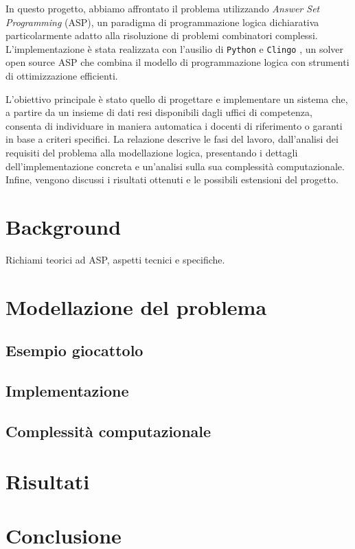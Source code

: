 \documentclass[draft, journal, onecolumn]{IEEEtran}
\begin{document}
In questo progetto, abbiamo affrontato il problema utilizzando \textit{Answer
Set Programming} (ASP), un paradigma di programmazione logica dichiarativa
particolarmente adatto alla risoluzione di problemi combinatori complessi.
L'implementazione è stata realizzata con l'ausilio di \texttt{Python}
\cite{python} e \texttt{Clingo} \cite{clingo}, un solver open source ASP che
combina il modello di programmazione logica con strumenti di ottimizzazione
efficienti.

L'obiettivo principale è stato quello di progettare e implementare un sistema
che, a partire da un insieme di dati resi disponibili dagli uffici di
competenza, consenta di individuare in maniera automatica i docenti di
riferimento o garanti in base a criteri specifici. La relazione descrive le fasi
del lavoro, dall'analisi dei requisiti del problema alla modellazione logica,
presentando i dettagli dell'implementazione concreta e un'analisi sulla sua
complessità computazionale. Infine, vengono discussi i risultati ottenuti e le
possibili estensioni del progetto.


\section{Background}
Richiami teorici ad ASP, aspetti tecnici e specifiche.

\section{Modellazione del problema}
\subsection{Esempio giocattolo}
\subsection{Implementazione}
\subsection{Complessità computazionale}

\section{Risultati}

\section{Conclusione}



\end{document}
